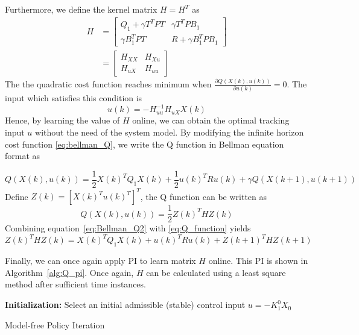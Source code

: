 Furthermore, we define the kernel matrix $H = H^T$ as
\begin{equation}
\begin{split}
H &=  \left[\begin{array}{cc}
Q_1+\gamma T^TPT & \gamma T^TPB_1 \\ 
\gamma B_1^TPT & R+\gamma B_1^TPB_1
\end{array}  \right] \\
&=\left[ \begin{array}{cc}
H_{XX} & H_{Xu} \\ 
H_{uX} & H_{uu}
\end{array} \right] 
\end{split}
\end{equation}
The the quadratic cost function reaches minimum when $ \frac{\partial Q(X(k), u(k))}{\partial u(k)} = 0 $. The input which satisfies this condition is
\begin{equation}
u(k) = -H_{uu}^{-1}H_{uX}X(k)
\end{equation}
Hence, by learning the value of $H$ online, we can obtain the optimal tracking input $u$ without the need of the system model. By modifying the infinite horizon cost function \eqref{eq:bellman_Q}, we write the Q function in Bellman equation format as

\begin{equation}
Q(X(k), u(k)) = \frac{1}{2}X(k)^TQ_1X(k) + \frac{1}{2}u(k)^TRu(k) + \gamma Q(X(k+1), u(k+1))
\label{eq:Bellman_Q2}
\end{equation}
Define $Z(k) = \left[ X(k)^T u(k)^T\right]^T$, the Q function can be written as
\begin{equation}
Q(X(k),u(k)) = \frac{1}{2}Z(k)^THZ(k)
\label{eq:Q_function}
\end{equation}
Combining equation~\eqref{eq:Bellman_Q2} with \eqref{eq:Q_function} yields
\begin{equation}
Z(k)^THZ(k) = X(k)^TQ_1X(k) + u(k)^TRu(k) + Z(k+1)^THZ(k+1)
\end{equation}

Finally, we can once again apply \acs {PI} to learn matrix $H$ online. This \acs {PI} is shown in Algorithm~\ref{alg:Q_pi}. Once again, $H$ can be calculated using a least square method after sufficient time instances.

\begin{algorithm}[H]
	\textbf{Initialization:} Select an initial admissible (stable) control input $u = -K^0_1X_0$\\
	\label{alg:Q_pi}
	\caption{Model-free Policy Iteration}
\end{algorithm}


